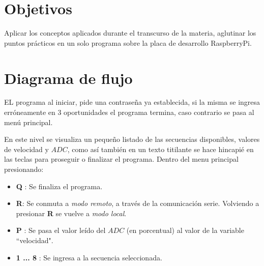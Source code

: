 \documentclass[11pt, a4paper]{article}
\begin{document}
\section{Objetivos}
Aplicar los conceptos aplicados durante el transcurso de la materia, aglutinar los puntos prácticos en un solo programa sobre la placa de desarrollo RaspberryPi. 

\clearpage %


\section{Diagrama de flujo}
EL programa al iniciar, pide una contraseña ya establecida, si la misma se ingresa erróneamente en 3 oportunidades el programa termina, caso contrario se pasa al menú principal.

En este nivel se visualiza un pequeño listado de las secuencias disponibles, valores de velocidad y $ADC$, como así también en un texto titilante se hace hincapié en las teclas para proseguir o finalizar el programa. Dentro del menu principal presionando:

\begin{itemize}
	\item \textbf{Q} : Se finaliza el programa.
	\item \textbf{R}: Se conmuta a \textit{modo remoto}, a través de la comunicación serie. Volviendo a presionar \textbf{R} se vuelve a \textit{modo local}.
	\item \textbf{P} : Se pasa el valor leído del $ADC$ (en porcentual) al valor de la variable ``velocidad".
	\item \textbf{1 ... 8} : Se ingresa a la secuencia seleccionada.
\end{itemize}
\end{document}
